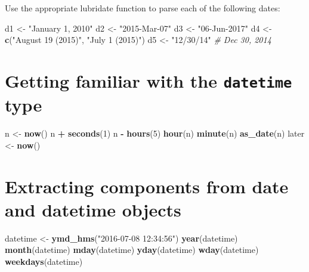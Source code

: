 \documentclass[
]{book}
\newenvironment{Shaded}{\begin{snugshade}}{\end{snugshade}}
\newcommand{\CommentTok}[1]{\textcolor[rgb]{0.56,0.35,0.01}{\textit{#1}}}
\newcommand{\DecValTok}[1]{\textcolor[rgb]{0.00,0.00,0.81}{#1}}
\newcommand{\KeywordTok}[1]{\textcolor[rgb]{0.13,0.29,0.53}{\textbf{#1}}}
\newcommand{\NormalTok}[1]{#1}
\newcommand{\OperatorTok}[1]{\textcolor[rgb]{0.81,0.36,0.00}{\textbf{#1}}}
\newcommand{\StringTok}[1]{\textcolor[rgb]{0.31,0.60,0.02}{#1}}
\begin{document}
Use the appropriate lubridate function to parse each of the following dates:

\begin{Shaded}
\begin{Highlighting}[]
\NormalTok{d1 <-}\StringTok{ "January 1, 2010"}
\NormalTok{d2 <-}\StringTok{ "2015-Mar-07"}
\NormalTok{d3 <-}\StringTok{ "06-Jun-2017"}
\NormalTok{d4 <-}\StringTok{ }\KeywordTok{c}\NormalTok{(}\StringTok{"August 19 (2015)"}\NormalTok{, }\StringTok{"July 1 (2015)"}\NormalTok{)}
\NormalTok{d5 <-}\StringTok{ "12/30/14"} \CommentTok{# Dec 30, 2014}
\end{Highlighting}
\end{Shaded}

\hypertarget{getting-familiar-with-the-datetime-type}{%
\section*{\texorpdfstring{Getting familiar with the \texttt{datetime} type}{Getting familiar with the datetime type}}\label{getting-familiar-with-the-datetime-type}}

\begin{Shaded}
\begin{Highlighting}[]
\NormalTok{n <-}\StringTok{ }\KeywordTok{now}\NormalTok{() }
\NormalTok{n }\OperatorTok{+}\StringTok{ }\KeywordTok{seconds}\NormalTok{(}\DecValTok{1}\NormalTok{)}
\NormalTok{n }\OperatorTok{-}\StringTok{ }\KeywordTok{hours}\NormalTok{(}\DecValTok{5}\NormalTok{)}
\KeywordTok{hour}\NormalTok{(n)}
\KeywordTok{minute}\NormalTok{(n)}
\KeywordTok{as_date}\NormalTok{(n)}
\NormalTok{later <-}\StringTok{ }\KeywordTok{now}\NormalTok{()}
\end{Highlighting}
\end{Shaded}

\hypertarget{extracting-components-from-date-and-datetime-objects}{%
\section*{Extracting components from date and datetime objects}\label{extracting-components-from-date-and-datetime-objects}}

\begin{Shaded}
\begin{Highlighting}[]
\NormalTok{datetime <-}\StringTok{ }\KeywordTok{ymd_hms}\NormalTok{(}\StringTok{"2016-07-08 12:34:56"}\NormalTok{)}
\KeywordTok{year}\NormalTok{(datetime)}
\KeywordTok{month}\NormalTok{(datetime)}
\KeywordTok{mday}\NormalTok{(datetime)}
\KeywordTok{yday}\NormalTok{(datetime)}
\KeywordTok{wday}\NormalTok{(datetime)}
\KeywordTok{weekdays}\NormalTok{(datetime)}
\end{Highlighting}
\end{Shaded}
\end{document}
